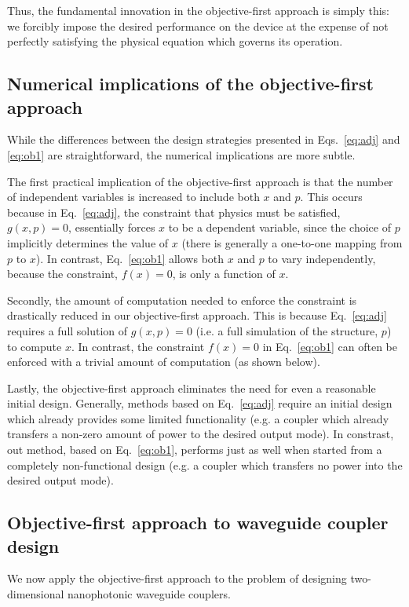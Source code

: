\documentclass[letterpaper,10pt]{article}
\begin{document}
Thus, the fundamental innovation in the objective-first approach
    is simply this:
    we forcibly impose the desired performance on the device at the expense of
    not perfectly satisfying the physical equation which governs its operation.

\subsection{Numerical implications of the objective-first approach}

While the differences between the design strategies presented in 
    Eqs.~\ref{eq:adj} and \ref{eq:ob1} are straightforward,
    the numerical implications are more subtle.

The first practical implication of the objective-first approach 
    is that the number of independent variables is increased to include
    both $x$ and $p$.
This occurs because in Eq.~\ref{eq:adj}, 
    the constraint that physics must be satisfied, $g(x,p)=0$, 
    essentially forces $x$ to be a dependent variable,
    since the choice of $p$ implicitly determines the value of $x$
    (there is generally a one-to-one mapping from $p$ to $x$).
In contrast, Eq.~\ref{eq:ob1} allows both $x$ and $p$ to vary independently,
    because the constraint, $f(x)=0$, is only a function of $x$.

Secondly, the amount of computation needed to enforce the constraint is
    drastically reduced in our objective-first approach.
This is because Eq.~\ref{eq:adj} requires a full solution of $g(x,p)=0$
    (i.e. a full simulation of the structure, $p$) to compute $x$.
In contrast, the constraint $f(x)=0$ in Eq.~\ref{eq:ob1} 
    can often be enforced with a trivial amount of computation (as shown below).

Lastly, the objective-first approach eliminates the need for even a reasonable
    initial design.
Generally, methods based on Eq.~\ref{eq:adj} require an initial design which
    already provides some limited functionality
    (e.g. a coupler which already transfers 
    a non-zero amount of power to the desired output mode).
In constrast, out method, based on Eq.~\ref{eq:ob1}, performs just as well
    when started from a completely non-functional design 
    (e.g. a coupler which transfers no power into the desired output mode).

\subsection{Objective-first approach to waveguide coupler design}
We now apply the objective-first approach to the problem of designing 
    two-dimensional nanophotonic waveguide couplers.
\end{document}
